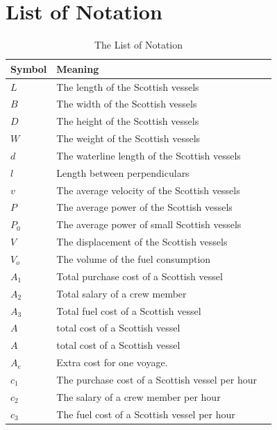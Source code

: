 \documentclass{mcmthesis}
\begin{document}
\section{List of Notation}

\begin{center}
\begin{longtable}{p{}p{}m{}}
\caption{The List of Notation}\\
\hline
Symbol& Meaning \\
\hline

$L$      & The length of the Scottish vessels \\
$B$      & The width of the Scottish vessels 
                                                          \\
$D$     & The height of the Scottish vessels 
                                                        \\
$W$     & The weight of the Scottish vessels 
                                                        \\
$d$      & The   waterline length of the Scottish vessels \\
$l$       & Length between perpendiculars                                                           \\
$v$      & The average velocity  of the Scottish vessels                                            \\
$P$      & The average power of the Scottish vessels\\
$P_0$      & The average power of small Scottish vessels\\                                                      
$V$      & The displacement of the Scottish vessels 
                                                          \\
$V_o$      & The volume of the fuel consumption
                                                          \\
$A_1$     & Total purchase cost of a Scottish vessel
                                                        \\
$A_2$       & Total salary of a crew member                                                           \\
$A_3$      & Total fuel cost of a Scottish vessel                                        \\
$A$      & total cost of a Scottish vessel                                        \\
$A$      & total cost of a Scottish vessel                                        \\
$A_e$      &Extra cost for one voyage.  \\
$c_1$     & The purchase cost of a Scottish vessel per hour
                                                        \\
$c_2$       & The salary of a crew member per hour                                                     \\
$c_3$      & The fuel cost of a Scottish vessel per hour                                       \\


\end{longtable}
\end{center}
\end{document}

